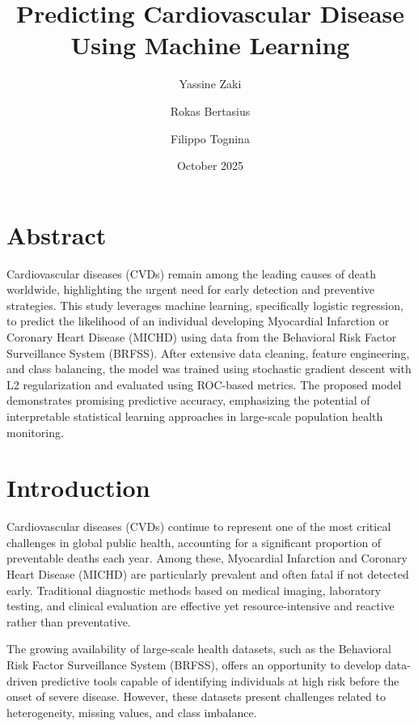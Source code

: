 \documentclass[twocolumn]{article}
\title{\textbf{Predicting Cardiovascular Disease Using Machine Learning}}
\author{Yassine Zaki \and Rokas Bertasius \and Filippo Tognina}
\date{October 2025}
\begin{document}
\maketitle

\section*{Abstract}
\noindent
Cardiovascular diseases (CVDs) remain among the leading causes of death worldwide, highlighting the urgent need for early detection and preventive strategies. This study leverages machine learning, specifically logistic regression, to predict the likelihood of an individual developing Myocardial Infarction or Coronary Heart Disease (MICHD) using data from the Behavioral Risk Factor Surveillance System (BRFSS). After extensive data cleaning, feature engineering, and class balancing, the model was trained using stochastic gradient descent with L2 regularization and evaluated using ROC-based metrics. The proposed model demonstrates promising predictive accuracy, emphasizing the potential of interpretable statistical learning approaches in large-scale population health monitoring.

\section{Introduction}
\noindent
Cardiovascular diseases (CVDs) continue to represent one of the most critical challenges in global public health, accounting for a significant proportion of preventable deaths each year. Among these, Myocardial Infarction and Coronary Heart Disease (MICHD) are particularly prevalent and often fatal if not detected early. Traditional diagnostic methods based on medical imaging, laboratory testing, and clinical evaluation are effective yet resource-intensive and reactive rather than preventative.

The growing availability of large-scale health datasets, such as the Behavioral Risk Factor Surveillance System (BRFSS), offers an opportunity to develop data-driven predictive tools capable of identifying individuals at high risk before the onset of severe disease. However, these datasets present challenges related to heterogeneity, missing values, and class imbalance.
\end{document}
